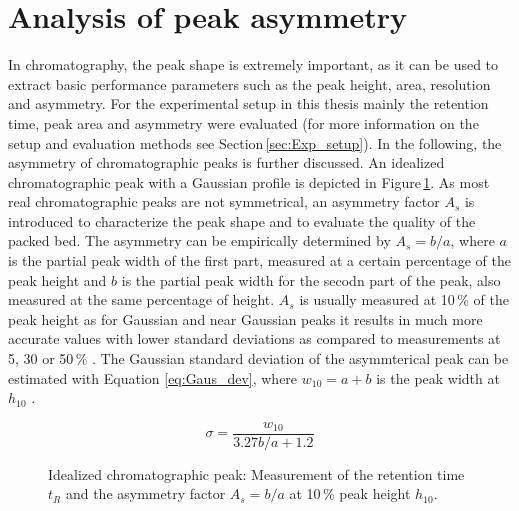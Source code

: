 \section{Analysis of peak asymmetry}
\label{sec:peak_as}
In chromatography, the peak shape is extremely important, as it can be used to extract basic performance parameters such as the peak height, area, resolution and asymmetry. For the experimental setup in this thesis mainly the retention time, peak area and asymmetry were evaluated (for more information on the setup and evaluation methods see Section\,\ref{sec:Exp_setup}). In the following, the asymmetry of chromatographic peaks is further discussed. \newline 
An idealized chromatographic peak with a Gaussian profile is depicted in Figure\,\ref{fig:peak_param}. As most real chromatographic peaks are not symmetrical, an asymmetry factor $A_{s}$ is introduced to characterize the peak shape and to evaluate the quality of the packed bed. The asymmetry can be empirically determined by $A_{s}=b/a$, where $a$ is the partial peak width of the first part, measured at a certain percentage of the peak height and $b$ is the partial peak width for the secodn part of the peak, also measured at the same percentage of height. $A_{s}$ is usually measured at 10\,\% of the peak height as for Gaussian and near Gaussian peaks it results in much more accurate values with lower standard deviations as compared to measurements at 5, 30 or 50\,\% \cite{foley1983equations}. The Gaussian standard deviation of the asymmterical peak can be estimated with Equation \ref{eq:Gaus_dev}, where $w_{10}=a+b$ is the peak width at $h_{10}$ \cite{papai2002analysis}.  

\begin{equation}
\sigma=\frac{w_{10}}{3.27 b/a + 1.2}
\label{eq:Gaus_dev}
\end{equation}

\begin{figure}[h]
\centering
{}
\caption[Idealized chromatographic peak]{Idealized chromatographic peak: Measurement of the retention time $t_{R}$ and the asymmetry factor $A_{s}=b/a$ at 10\,\% peak height $h_{10}$.  
\label{fig:peak_param}
}
\end{figure}

